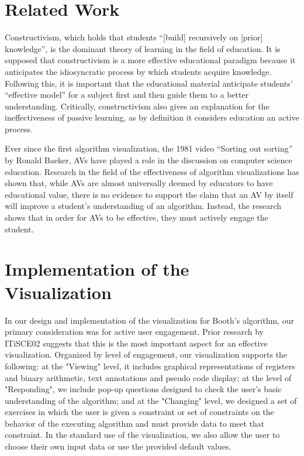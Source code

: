 \documentclass{acm_proc_article-sp}
\begin{document}
\section{Related Work}
Constructivism, which holds that students ``[build] recursively on [prior] knowledge'', is the dominant theory of learning in the field of education.
It is supposed that constructivism is a more effective educational paradigm because it anticipates the idiosyncratic process by which students acquire knowledge\cite{constr}.
Following this, it is important that the educational material anticipate students' ``effective model'' for a subject first and then guide them to a better understanding.
Critically, constructivism also gives an explanation for the ineffectiveness of passive learning, as by definition it considers education an active process\cite{constr}.

Ever since the first algorithm visualization, the 1981 video ``Sorting out sorting'' by Ronald Baeker, AVs have played a role in the discussion on computer science education.
Research in the field of the effectiveness of algorithm visualizations has shown that, while AVs are almost universally deemed by educators to have educational value, there is no evidence to support the claim that an AV by itself will improve a student's understanding of an algorithm.
Instead, the research shows that in order for AVs to be effective, they must actively engage the student\cite{tnaps:visengage}.

\section{Implementation of the Visualization}
In our design and implementation of the visualization for Booth's algorithm, our primary consideration was for active user engagement.
Prior research by ITiSCE02 suggests that this is the most important aspect for an effective visualization.\cite{tnaps:visengage}
Organized by level of engagement, our visualization supports the following: at the "Viewing" level, it includes graphical representations of registers and binary arithmetic, text annotations and pseudo code
 display; at the level of "Responding", we include pop-up questions designed to check the user's basic understanding of the algorithm; and at the "Changing" level, we designed a set of exercises in which the user is given a constraint or set of constraints on the behavior of the executing algorithm and must provide data to meet that constraint.
In the standard use of the visualization, we also allow the user to choose their own input data or use the provided default values.
\end{document}
